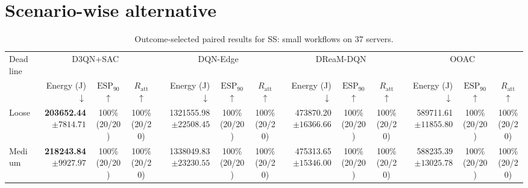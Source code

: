 \documentclass[10pt]{article}
\begin{document}
\section*{Scenario-wise alternative}
\begin{table}[!htbp]
\centering
\caption{Outcome-selected paired results for SS: small workflows on 37 servers.}
\label{tab:conditional_case_ss}
\begingroup
\footnotesize
\setlength{\tabcolsep}{2.2pt}
\renewcommand{\arraystretch}{1.08}
\begin{tabular}{@{}l*{4}{rcc}@{}}
\toprule
Deadline & \multicolumn{3}{c}{D3QN+SAC} & \multicolumn{3}{c}{DQN-Edge} & \multicolumn{3}{c}{DReaM-DQN} & \multicolumn{3}{c}{OOAC} \\
\cmidrule(lr){2-4}\cmidrule(lr){5-7}\cmidrule(lr){8-10}\cmidrule(lr){11-13}
 & Energy (J) $\downarrow$ & $\mathrm{ESP}_{90}$ $\uparrow$ & $R_{\mathrm{att}}$ $\uparrow$ & Energy (J) $\downarrow$ & $\mathrm{ESP}_{90}$ $\uparrow$ & $R_{\mathrm{att}}$ $\uparrow$ & Energy (J) $\downarrow$ & $\mathrm{ESP}_{90}$ $\uparrow$ & $R_{\mathrm{att}}$ $\uparrow$ & Energy (J) $\downarrow$ & $\mathrm{ESP}_{90}$ $\uparrow$ & $R_{\mathrm{att}}$ $\uparrow$ \\
\midrule
Loose & \shortstack[r]{\textbf{203652.44}\\$\pm 7814.71$} & \shortstack[c]{100\%\\(20/20)} & \shortstack[c]{100\%\\(20/20)} & \shortstack[r]{1321555.98\\$\pm 22508.45$} & \shortstack[c]{100\%\\(20/20)} & \shortstack[c]{100\%\\(20/20)} & \shortstack[r]{473870.20\\$\pm 16366.66$} & \shortstack[c]{100\%\\(20/20)} & \shortstack[c]{100\%\\(20/20)} & \shortstack[r]{589711.61\\$\pm 11855.80$} & \shortstack[c]{100\%\\(20/20)} & \shortstack[c]{100\%\\(20/20)} \\
Medium & \shortstack[r]{\textbf{218243.84}\\$\pm 9927.97$} & \shortstack[c]{100\%\\(20/20)} & \shortstack[c]{100\%\\(20/20)} & \shortstack[r]{1338049.83\\$\pm 23230.55$} & \shortstack[c]{100\%\\(20/20)} & \shortstack[c]{100\%\\(20/20)} & \shortstack[r]{475313.65\\$\pm 15346.00$} & \shortstack[c]{100\%\\(20/20)} & \shortstack[c]{100\%\\(20/20)} & \shortstack[r]{588235.39\\$\pm 13025.78$} & \shortstack[c]{100\%\\(20/20)} & \shortstack[c]{100\%\\(20/20)} \\

\end{tabular}
\end{table}
\end{document}
